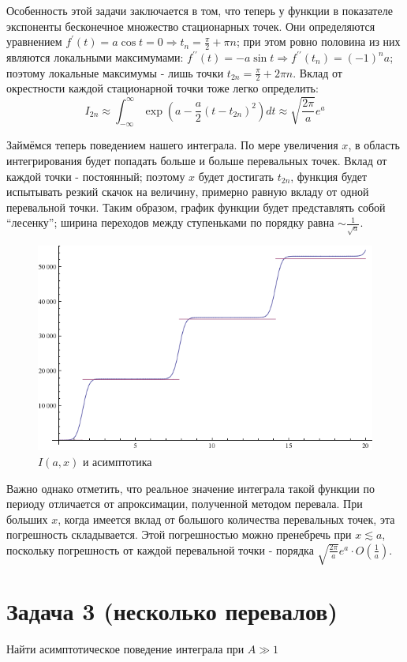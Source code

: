 \documentclass[a4paper,12pt]{article}
\begin{document}
Особенность этой задачи заключается в том, что теперь у функции в
показателе экспоненты бесконечное множество стационарных точек. Они
определяются уравнением $f^{\prime}(t)=a\cos t=0\Rightarrow t_{n}=\frac{\pi}{2}+\pi n$;
при этом ровно половина из них являются локальными максимумами: $f^{\prime\prime}(t)=-a\sin t\Rightarrow f^{\prime\prime}(t_{n})=\left(-1\right)^{n}a$;
поэтому локальные максимумы - лишь точки $t_{2n}=\frac{\pi}{2}+2\pi n$.
Вклад от окрестности каждой стационарной точки тоже легко определить:
\[
I_{2n}\approx\int_{-\infty}^{\infty}\exp(a-\frac{a}{2}(t-t_{2n})^{2})dt\approx\sqrt{\frac{2\pi}{a}}e^{a}
\]

\noindent
Займёмся теперь поведением нашего интеграла. По мере увеличения $x$,
в область интегрирования будет попадать больше и больше перевальных
точек. Вклад от каждой точки - постоянный; поэтому $x$ будет достигать
$t_{2n}$, функция будет испытывать резкий скачок на величину, примерно
равную вкладу от одной перевальной точки. Таким образом, график функции
будет представлять собой ``лесенку''; ширина переходов между ступеньками по порядку равна
 $\sim\frac{1}{\sqrt{a}}$.

\begin{figure}[h]
	\caption{$I(a,x)$ и асимптотика}
	\centering
	\includegraphics[width=0.5\columnwidth]{ladder.png}
\end{figure}

\noindent
Важно однако отметить, что реальное значение интеграла
такой функции по периоду отличается от апроксимации, полученной методом
перевала. При больших $x$, когда имеется вклад от большого количества
перевальных точек, эта погрешность складывается. Этой погрешностью
можно пренебречь при $x\lesssim a$, поскольку погрешность от каждой
перевальной точки - порядка $\sqrt{\frac{2\pi}{a}}e^{a}\cdot O\left(\frac{1}{a}\right)$.

\section{Задача 3 (несколько перевалов)}

Найти асимптотическое поведение интеграла при $A\gg1$
\end{document}

